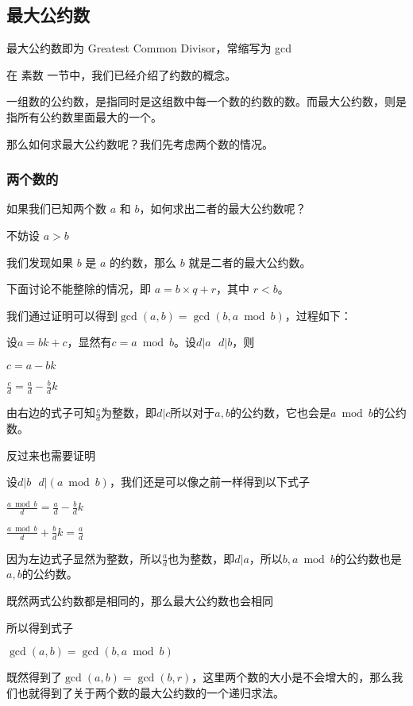 
\subsection{最大公约数}

最大公约数即为 Greatest Common Divisor，常缩写为 gcd

在  素数  一节中，我们已经介绍了约数的概念。

一组数的公约数，是指同时是这组数中每一个数的约数的数。而最大公约数，则是指所有公约数里面最大的一个。

那么如何求最大公约数呢？我们先考虑两个数的情况。

\subsubsection{两个数的}

如果我们已知两个数 $a$ 和 $b$，如何求出二者的最大公约数呢？

不妨设 $a > b$

我们发现如果 $b$ 是 $a$ 的约数，那么 $b$ 就是二者的最大公约数。

下面讨论不能整除的情况，即 $a = b \times q + r$，其中 $r < b$。

我们通过证明可以得到$\gcd(a,b)=\gcd(b,a \bmod b)$，过程如下：

\hr

设$a=bk+c$，显然有$c=a \bmod b$。设$d|a\ \ \ d|b$，则

$c=a-bk$

$\frac{c}{d}=\frac{a}{d}-\frac{b}{d}k$

由右边的式子可知$\frac{c}{d}$为整数，即$d|c$所以对于$a,b$的公约数，它也会是$a \bmod b$的公约数。

反过来也需要证明

设$d|b\ \ \ d|(a \bmod b)$，我们还是可以像之前一样得到以下式子

$\frac{a\bmod b}{d}=\frac{a}{d}-\frac{b}{d}k$

$\frac{a\bmod b}{d}+\frac{b}{d}k=\frac{a}{d}$

因为左边式子显然为整数，所以$\frac{a}{d}$也为整数，即$d|a$，所以$b,a\bmod b$的公约数也是$a,b$的公约数。

既然两式公约数都是相同的，那么最大公约数也会相同

所以得到式子

$\gcd(a,b)=\gcd(b,a\bmod b)$

既然得到了$\gcd(a, b) = \gcd(b, r)$，这里两个数的大小是不会增大的，那么我们也就得到了关于两个数的最大公约数的一个递归求法。

